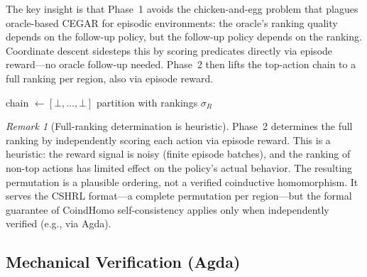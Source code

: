 \documentclass[9pt,a4paper]{article}
\theoremstyle{plain}
\theoremstyle{definition}
\theoremstyle{remark}
\newtheorem{remark}{Remark}
\begin{document}
The key insight is that Phase~1 avoids the chicken-and-egg
problem that plagues oracle-based CEGAR for episodic
environments: the oracle's ranking quality depends on the
follow-up policy, but the follow-up policy depends on the
ranking. Coordinate descent sidesteps this by scoring
predicates directly via episode reward---no oracle follow-up
needed. Phase~2 then lifts the top-action chain to a full
ranking per region, also via episode reward.

\begin{algorithm}[t]
\SetAlgoLined
{}
chain $\leftarrow [\bot, \ldots, \bot]$ 
\Return partition with rankings $\sigma_R$\;
\caption{Coordinate Descent + Full-Ranking Determination (episodic tasks)}
\label{alg:coord-descent}
\end{algorithm}

\begin{remark}[Full-ranking determination is heuristic]
Phase~2 determines the full ranking by independently scoring each
action via episode reward.  This is a heuristic: the reward signal
is noisy (finite episode batches), and the ranking of non-top
actions has limited effect on the policy's actual behavior.  The
resulting permutation is a plausible ordering, not a verified
coinductive homomorphism.  It serves the CSHRL format---a
complete permutation per region---but the formal guarantee
of CoindHomo self-consistency applies only when independently
verified (e.g., via Agda).
\end{remark}

\subsection{Mechanical Verification (Agda)}
\end{document}

